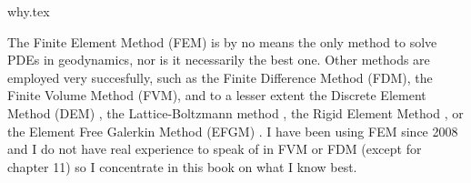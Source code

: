 \begin{flushright} {\tiny {\color{gray} why.tex}} \end{flushright}

The Finite Element Method (FEM) is by no means the only method 
to solve PDEs in geodynamics, nor is it necessarily the best one.
Other methods are employed very succesfully, such as the Finite Difference 
Method (FDM), the Finite Volume Method (FVM), and to a lesser extent
the Discrete Element Method (DEM) \cite{tasy05,egho07,egsc07,funi14}, 
the Lattice-Boltzmann method \cite{hupc08}, the Rigid Element Method \cite{lacj15},  
or the Element Free Galerkin Method (EFGM) \cite{hans03}.
I have been using FEM since 2008 and I do not have real 
experience to speak of in FVM or FDM (except for chapter 11)
so I concentrate in this book 
on what I know best. 


